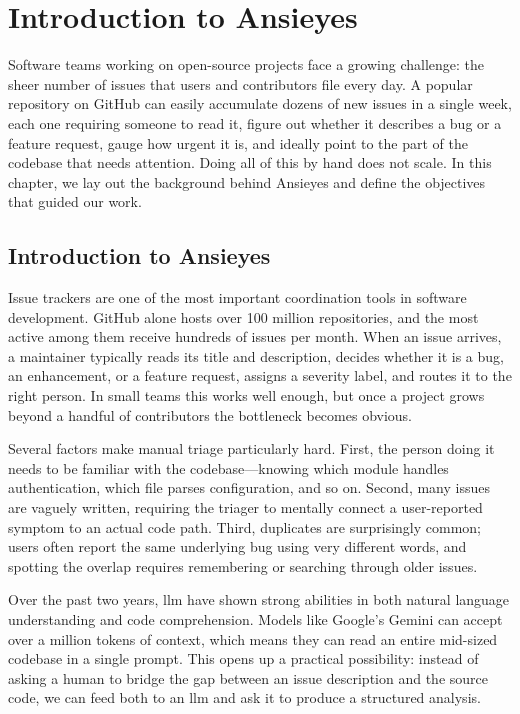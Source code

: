 \chapter{Introduction to Ansieyes}
Software teams working on open-source projects face a growing challenge: the sheer number of issues that users and contributors file every day. A popular repository on GitHub can easily accumulate dozens of new issues in a single week, each one requiring someone to read it, figure out whether it describes a bug or a feature request, gauge how urgent it is, and ideally point to the part of the codebase that needs attention. Doing all of this by hand does not scale. In this chapter, we lay out the background behind Ansieyes and define the objectives that guided our work.

\section{Introduction to Ansieyes}
Issue trackers are one of the most important coordination tools in software development. GitHub alone hosts over 100 million repositories, and the most active among them receive hundreds of issues per month. When an issue arrives, a maintainer typically reads its title and description, decides whether it is a bug, an enhancement, or a feature request, assigns a severity label, and routes it to the right person. In small teams this works well enough, but once a project grows beyond a handful of contributors the bottleneck becomes obvious.

Several factors make manual triage particularly hard. First, the person doing it needs to be familiar with the codebase---knowing which module handles authentication, which file parses configuration, and so on. Second, many issues are vaguely written, requiring the triager to mentally connect a user-reported symptom to an actual code path. Third, duplicates are surprisingly common; users often report the same underlying bug using very different words, and spotting the overlap requires remembering or searching through older issues.

Over the past two years, \gls{llm} have shown strong abilities in both natural language understanding and code comprehension. Models like Google's Gemini can accept over a million tokens of context, which means they can read an entire mid-sized codebase in a single prompt. This opens up a practical possibility: instead of asking a human to bridge the gap between an issue description and the source code, we can feed both to an \gls{llm} and ask it to produce a structured analysis.

